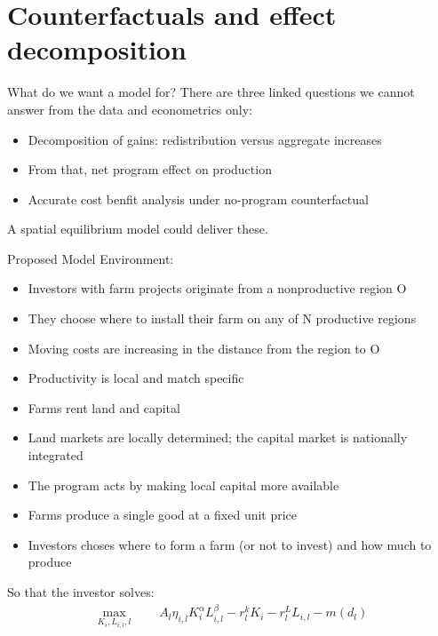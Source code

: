 \documentclass[aspectratio=169]{beamer}
\begin{document}
\section{Counterfactuals and effect decomposition}

\begin{frame}{What do we want a model for?}
There are three linked questions we cannot answer from the data and econometrics only:
\begin{itemize}
  \item Decomposition of gains: redistribution versus aggregate increases
  \item From that, net program effect on production
  \item Accurate cost benfit analysis under no-program counterfactual
\end{itemize}
\vspace{1em}
A spatial equilibrium model could deliver these.
\end{frame}

\begin{frame}{Proposed Model}
Environment:
\begin{itemize}
  \item Investors with farm projects originate from a nonproductive region O
  \item They choose where to install their farm on any of N productive regions
  \item Moving costs are increasing in the distance from the region to O 
  \item Productivity is local and match specific
  \item Farms rent land and capital
  \item Land markets are locally determined; the capital market is nationally integrated  
  \item The program acts by making local capital more available
  \item Farms produce a single good at a fixed unit price
  \item Investors choses where to form a farm (or not to invest) and how much to produce
\end{itemize}
\vspace{1em}

So that the investor solves:
\begin{align}
\max_{K_i, L_{i,l}, l} \qquad A_l\eta_{i, l}K_i^\alpha L_{i, l}^\beta - r_l^k K_i - r_l^L L_{i, l} - m(d_l)
\end{align}

\end{frame}
\end{document}
